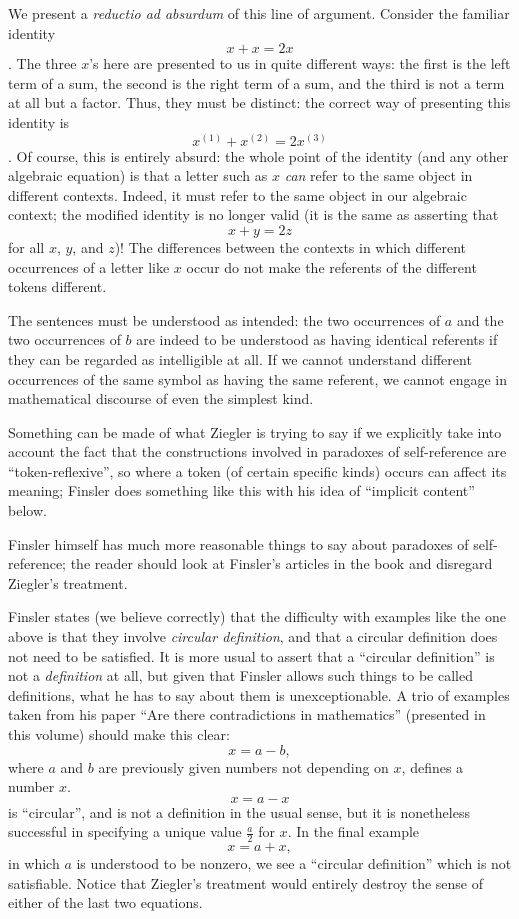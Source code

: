 We present a {\em reductio ad absurdum\/} of this line of argument.
Consider the familiar identity $$x + x = 2x$$.  The three $x$'s here
are presented to us in quite different ways: the first is the left
term of a sum, the second is the right term of a sum, and the third is
not a term at all but a factor.  Thus, they must be distinct: the
correct way of presenting this identity is $$x^{(1)}+x^{(2)} =
2x^{(3)}$$.  Of course, this is entirely absurd: the whole point of
the identity (and any other algebraic equation) is that a letter such
as $x$ {\em can\/} refer to the same object in different contexts.
Indeed, it must refer to the same object in our algebraic context; the
modified identity is no longer valid (it is the same as asserting that
$$x + y = 2z$$ for all $x$, $y$, and $z$)!  The differences between
the contexts in which different occurrences of a letter like $x$ occur
do not make the referents of the different tokens different.

The sentences must be understood as intended: the two occurrences of
$a$ and the two occurrences of $b$ are indeed to be understood as
having identical referents if they can be regarded as intelligible at
all.  If we cannot understand different occurrences of the same symbol
as having the same referent, we cannot engage in mathematical
discourse of even the simplest kind.

Something can be made of what Ziegler is trying to say if we
explicitly take into account the fact that the constructions involved
in paradoxes of self-reference are ``token-reflexive'', so where a
token (of certain specific kinds) occurs can affect its meaning;
Finsler does something like this with his idea of ``implicit content''
below.

Finsler himself has much more reasonable things to say about paradoxes
of self-reference; the reader should look at Finsler's articles in the
book and disregard Ziegler's treatment.

Finsler states (we believe correctly) that the difficulty with
examples like the one above is that they involve {\em circular
definition\/}, and that a circular definition does not need to be
satisfied.  It is more usual to assert that a ``circular definition''
is not a {\em definition\/} at all, but given that Finsler allows such
things to be called definitions, what he has to say about them is
unexceptionable.  A trio of examples taken from his paper ``Are there
contradictions in mathematics'' (presented in this volume) should make
this clear: $$x = a-b,$$ where $a$ and $b$ are previously given
numbers not depending on $x$, defines a number $x$.  $$x = a-x$$ is
``circular'', and is not a definition in the usual sense, but it is
nonetheless successful in specifying a unique value $\frac a2$ for
$x$.  In the final example $$x = a+x,$$ in which $a$ is understood to
be nonzero, we see a ``circular definition'' which is not satisfiable.
Notice that Ziegler's treatment would entirely destroy the sense of
either of the last two equations.

